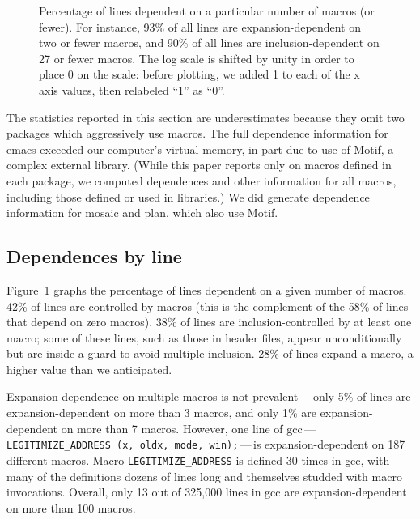 \documentclass[10pt]{article}
\newcommand{\pkg}[1]{\textsf{#1}}
\newcommand{\captionsmall}[1]{\caption[]{\small #1}}
\begin{document}
\begin{figure}
\centerline{}

\captionsmall{Percentage of lines dependent on a particular number of macros (or
  fewer).  For instance, 93\% of all lines are expansion-dependent on two
  or fewer macros, and 90\% of all lines are inclusion-dependent on 27 or
  fewer macros.  The log scale is shifted by unity in order to place 0
  on the scale:  before plotting, we added 1 to each of the x axis values,
  then relabeled ``1'' as ``0''.}
\label{fig:dep-byline}
\end{figure}


The statistics reported in this section are underestimates because they
omit two packages which aggressively use macros.  The full dependence
information for \pkg{emacs} exceeded our computer's
virtual memory, in part due to use of Motif, a complex external library.
(While this paper reports only on macros defined in each package, we
computed dependences and other information for all macros, including those
defined or used in libraries.)  We did generate dependence information for
\pkg{mosaic} and \pkg{plan}, which also use Motif.


\subsection{Dependences by line}


Figure~\ref{fig:dep-byline} graphs the percentage of lines dependent on a
given number of macros.  42\% of lines are controlled by
macros (this is the complement of the 58\% of lines that depend on zero
macros).  38\% of lines are inclusion-controlled by at least
one macro; some of these lines, such as those in header files, appear
unconditionally but are inside a guard to avoid multiple inclusion.  28\%
of lines expand a macro, a higher value than we
anticipated.

Expansion dependence on multiple macros is not prevalent\,---\,only 5\% of
lines are expansion-dependent on more than 3 macros, and only 1\% are
expansion-dependent on more than 7 macros.  However, one line of
\pkg{gcc}\,---\,{\tt \verb|LEGITIMIZE_ADDRESS| (x, oldx, mode,
win);}\,---\,is expansion-dependent on 187 different macros.  Macro
\verb|LEGITIMIZE_ADDRESS| is defined 30 times in \pkg{gcc}, with many of the
definitions dozens of lines long and themselves studded with macro
invocations.  Overall, only 13 out of 325,000 lines in \pkg{gcc} are
expansion-dependent on more than 100 macros.
\end{document}
